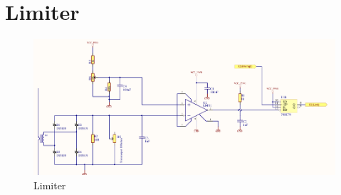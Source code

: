 



\newpage
\section{Limiter}

\begin{figure}[h!]
    \centering
    \includegraphics[width=\textwidth]{Skjema/TK513_Limiter.pdf}
    \caption{Limiter}
    \label{fig:my_label}
\end{figure}

